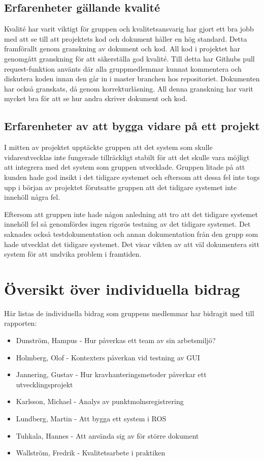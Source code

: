 \subsection{Erfarenheter gällande kvalité}

Kvalité har varit viktigt för gruppen och kvalitetsansvarig har gjort ett bra jobb med att se till att projektets kod och dokument håller en hög standard. Detta framförallt genom granskning av dokument och kod. All kod i projektet har genomgått granskning för att säkerställa god kvalité. Till detta har Githubs pull request-funktion använts där alla gruppmedlemmar kunnat kommentera och diskutera koden innan den går in i master branchen hos repositoriet. Dokumenten har också granskats, då genom korrekturläsning. All denna granskning har varit mycket bra för att se hur andra skriver dokument och kod.

\subsection{Erfarenheter av att bygga vidare på ett projekt}

I mitten av projektet upptäckte gruppen att det system som skulle vidareutvecklas inte fungerade tillräckligt stabilt för att det skulle vara möjligt att integrera med det system som gruppen utvecklade. Gruppen litade på att kunden hade god insikt i det tidigare systemet och eftersom att dessa fel inte togs upp i början av projektet förutsatte gruppen att det tidigare systemet inte innehöll några fel.

Eftersom att gruppen inte hade någon anledning att tro att det tidigare systemet innehöll fel så genomfördes ingen rigorös testning av det tidigare systemet. Det saknades också testdokumentation och  annan dokumentation från den grupp som hade utvecklat det tidigare systemet. Det visar vikten av att väl dokumentera sitt system för att undvika problem i framtiden.


\section{Översikt över individuella bidrag}

Här listas de individuella bidrag som gruppens medlemmar har bidragit med till rapporten:

\begin{itemize}
	\item Dunström, Hampus - Hur påverkas ett team av sin arbetsmiljö?
	\item Holmberg, Olof - Kontexters påverkan vid testning av GUI
	\item Jannering, Gustav - Hur kravhanteringsmetoder påverkar ett utvecklingsprojekt
	\item Karlsson, Michael - Analys av punktmolnsregistrering
	\item Lundberg, Martin - Att bygga ett system i ROS
	\item Tuhkala, Hannes - Att använda sig av \latex för större dokument
	\item Wallström, Fredrik - Kvalitetsarbete i praktiken
\end{itemize}


